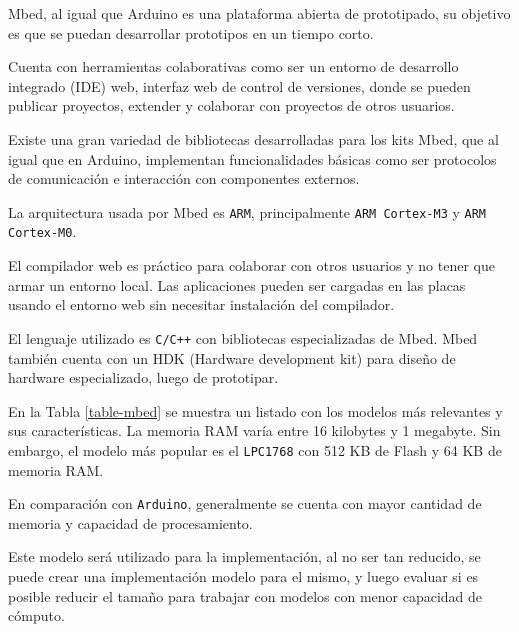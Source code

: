 
  Mbed, al igual que Arduino es una plataforma abierta de prototipado,
su objetivo es que se puedan desarrollar prototipos en un tiempo corto.

  Cuenta con herramientas colaborativas como ser un entorno de
  desarrollo integrado (IDE) web, interfaz web de control de versiones,
donde se pueden publicar proyectos, extender y colaborar con
proyectos de otros usuarios.

  Existe una gran variedad de bibliotecas desarrolladas para los
kits Mbed, que al igual que en Arduino, implementan funcionalidades
básicas como ser protocolos de comunicación e interacción con
componentes externos.

  La arquitectura usada por Mbed es \texttt{ARM}, principalmente
\texttt{ARM Cortex-M3} y \texttt{ARM Cortex-M0}.

  El compilador web es práctico para colaborar con otros
usuarios y no tener que armar un entorno local.
  Las aplicaciones pueden ser cargadas en las placas usando el
entorno web sin necesitar instalación del compilador.

  El lenguaje utilizado es \texttt{C/C++} con bibliotecas especializadas
de Mbed.
  Mbed también cuenta con un HDK (Hardware development kit) para diseño de
hardware especializado, luego de prototipar.

  En la Tabla \ref{table-mbed} se muestra un listado con los modelos
más relevantes y sus características.
  La memoria RAM varía entre 16 kilobytes y 1 megabyte.
  Sin embargo, el modelo más popular es el \texttt{LPC1768}
con 512 KB de Flash y 64 KB de memoria RAM.

  En comparación con \texttt{Arduino}, generalmente se cuenta con
mayor cantidad de memoria y capacidad de procesamiento.

  Este modelo será utilizado para la implementación, al no ser tan
reducido, se puede crear una implementación modelo para el mismo, y luego
evaluar si es posible reducir el tamaño para trabajar con modelos
con menor capacidad de cómputo.

